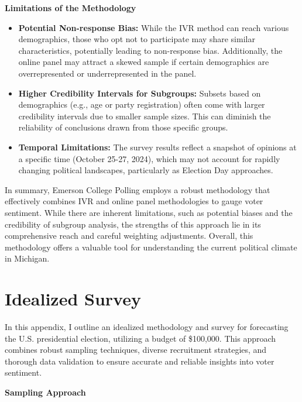 \documentclass[
  letterpaper,
  DIV=11,
  numbers=noendperiod]{scrartcl}
\begin{document}
\textbf{Limitations of the Methodology}

\begin{itemize}
\item
  \textbf{Potential Non-response Bias:} While the IVR method can reach
  various demographics, those who opt not to participate may share
  similar characteristics, potentially leading to non-response bias.
  Additionally, the online panel may attract a skewed sample if certain
  demographics are overrepresented or underrepresented in the panel.
\item
  \textbf{Higher Credibility Intervals for Subgroups:} Subsets based on
  demographics (e.g., age or party registration) often come with larger
  credibility intervals due to smaller sample sizes. This can diminish
  the reliability of conclusions drawn from those specific groups.
\item
  \textbf{Temporal Limitations:} The survey results reflect a snapshot
  of opinions at a specific time (October 25-27, 2024), which may not
  account for rapidly changing political landscapes, particularly as
  Election Day approaches.
\end{itemize}

In summary, Emerson College Polling employs a robust methodology that
effectively combines IVR and online panel methodologies to gauge voter
sentiment. While there are inherent limitations, such as potential
biases and the credibility of subgroup analysis, the strengths of this
approach lie in its comprehensive reach and careful weighting
adjustments. Overall, this methodology offers a valuable tool for
understanding the current political climate in Michigan.

\section{Idealized Survey}\label{idealized-survey}

In this appendix, I outline an idealized methodology and survey for
forecasting the U.S. presidential election, utilizing a budget of
\$100,000. This approach combines robust sampling techniques, diverse
recruitment strategies, and thorough data validation to ensure accurate
and reliable insights into voter sentiment.

\textbf{Sampling Approach}
\end{document}
